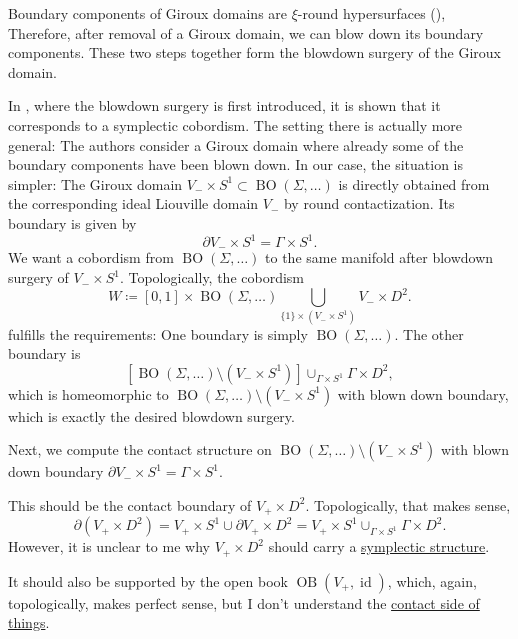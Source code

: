 \begin{figure}
\begin{subfigure}{.9\linewidth}
    \end{subfigure}
\end{figure}

Boundary components of Giroux domains are 
$\xi$-round hypersurfaces (\cite[Section 5.3]{MNW13}),
Therefore, after removal of a Giroux domain, we can blow down
its boundary components.
These two steps together form the blowdown surgery of the Giroux domain.

In \cite[Section 6]{MNW13}, where the blowdown surgery is first introduced,
it is shown that it corresponds to a symplectic cobordism.
The setting there is actually more general: The authors consider a Giroux
domain where already some of the boundary components have been blown down.
In our case, the situation is simpler: The Giroux domain 
$V_- \times S^1 \subset \operatorname{BO}(\Sigma, \dots)$
is directly obtained from the corresponding ideal Liouville domain $V_-$ by 
round contactization.
Its boundary is given by 
\[
    \partial V_- \times S^1 = \Gamma \times S^1.
\]
We want a cobordism from $\operatorname{BO}(\Sigma, \dots)$ to
the same manifold after blowdown surgery of $V_- \times S^1$.
Topologically, the cobordism
\[
    W \coloneqq [0,1] \times \operatorname{BO}(\Sigma, \dots) \bigcup_{\{1\} \times \left(V_- \times S^1\right)} V_- \times D^2.
\]
fulfills the requirements: One boundary is simply 
$\operatorname{BO}(\Sigma, \dots)$.
The other boundary is 
\[
    \left[\operatorname{BO}(\Sigma, \dots) \setminus \left(V_- \times S^1\right)\right] 
    \cup_{\Gamma \times S^1} \Gamma \times D^2,
\]
which is homeomorphic to 
$\operatorname{BO}(\Sigma, \dots) \setminus \left(V_- \times S^1\right)$
with blown down boundary, which is exactly the desired blowdown surgery.

Next, we compute the contact structure on $\operatorname{BO}(\Sigma, \dots) \setminus \left(V_- \times S^1\right)$
with blown down boundary $\partial V_- \times S^1 = \Gamma \times S^1$.

This should be the contact boundary of $V_+ \times D^2$.
Topologically, that makes sense,
\[
    \partial (V_+ \times D^2) = V_+ \times S^1 \cup \partial V_+ \times D^2 = V_+ \times S^1 \cup_{\Gamma \times S^1} \Gamma \times D^2.
\]
However, it is unclear to me why $V_+ \times D^2$ should carry a \underline{symplectic structure}.

It should also be supported by the open book $\operatorname{OB}(V_+, \operatorname{id})$,
which, again, topologically, makes perfect sense, but I don't understand the
\underline{contact side of things}.